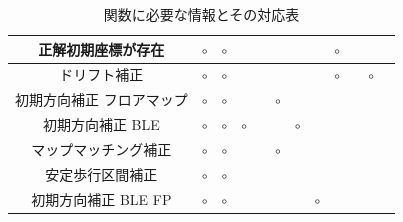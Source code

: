 \documentclass[Japanese]{dicomopapers}
\begin{document}
\begin{table}[ht]
{\begin{tabular}{|c|c|c|c|c|c|c|c|c|c|c|c|}
			正解初期座標が存在     & \multicolumn{1}{c|}{$\circ$} & \multicolumn{1}{c|}{$\circ$} &                              &        &                                                                                                               &                              &                              & \multicolumn{1}{c|}{$\circ$} &    &                              &    \\ \hline
			ドリフト補正        & \multicolumn{1}{c|}{$\circ$} & \multicolumn{1}{c|}{$\circ$} &                              &        &                                                                                                               &                              &                              & \multicolumn{1}{c|}{$\circ$} &    & \multicolumn{1}{c|}{$\circ$} &    \\ \hline
			初期方向補正 フロアマップ & \multicolumn{1}{c|}{$\circ$} & \multicolumn{1}{c|}{$\circ$} &                              &        & \multicolumn{1}{c|}{$\circ$}                                                                                  &                              &                              &                              &    &                              &    \\ \hline
			初期方向補正 BLE    & \multicolumn{1}{c|}{$\circ$} & \multicolumn{1}{c|}{$\circ$} & \multicolumn{1}{c|}{$\circ$} &        &                                                                                                               & \multicolumn{1}{c|}{$\circ$} &                              &                              &    &                              &    \\ \hline
			マップマッチング補正    & \multicolumn{1}{c|}{$\circ$} & \multicolumn{1}{c|}{$\circ$} &                              &        & \multicolumn{1}{c|}{$\circ$}                                                                                  &                              &                              &                              &    &                              &    \\ \hline
			安定歩行区間補正      & \multicolumn{1}{c|}{$\circ$} & \multicolumn{1}{c|}{$\circ$} &                              &        &                                                                                                               &                              &                              &                              &    &                              &    \\ \hline
			初期方向補正 BLE FP & \multicolumn{1}{c|}{$\circ$} & \multicolumn{1}{c|}{$\circ$} &                              &        &                                                                                                               &                              & \multicolumn{1}{c|}{$\circ$} &                              &    &                              &    \\ \hline
		\end{tabular}
	}
	\caption{関数に必要な情報とその対応表} \label{}
\end{table}
\end{document}
